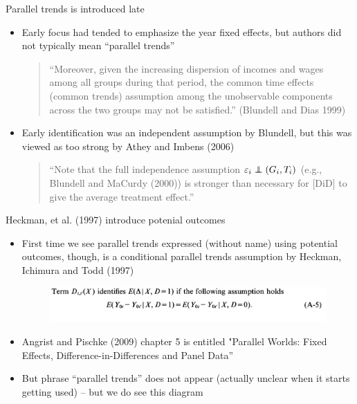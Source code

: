 \documentclass{beamer}
\newcommand\independent{\protect\mathpalette{\protect\independenT}{\perp}}
\def\independenT#1#2{\mathrel{\rlap{$#1#2$}\mkern2mu{#1#2}}}
\begin{document}
\begin{frame}{Parallel trends is introduced late}

\begin{itemize}

\item Early focus had tended to emphasize the year fixed effects, but authors did not typically mean ``parallel trends'' 
	\begin{quote}
	“Moreover, given the increasing dispersion of incomes and wages among all groups during that period, the common time effects (common trends) assumption among the unobservable components across the two groups may not be satisfied.” (Blundell and Dias 1999)
	\end{quote}
\item Early identification was an independent assumption by Blundell, but this was viewed as too strong by Athey and Imbens (2006)

\begin{quote}
“Note that the full independence assumption $\varepsilon_i \independent(G_i,T_i)$ (e.g., Blundell and MaCurdy (2000)) is stronger than necessary for [DiD] to give the average treatment effect.”
\end{quote}

\end{itemize}

\end{frame}


\begin{frame}{Heckman, et al. (1997) introduce potenial outcomes}


\begin{itemize}
\item First time we see parallel trends expressed (without name) using potential outcomes, though, is a conditional parallel trends assumption by Heckman, Ichimura and Todd (1997)

\bigskip

	\begin{figure}
	\includegraphics[scale=0.2]{./lecture_includes/heckman_cpt}
	\end{figure}


\item Angrist and Pischke (2009) chapter 5 is entitled "Parallel Worlds: Fixed Effects, Difference-in-Differences and Panel Data''
\item But phrase ``parallel trends'' does not appear (actually unclear when it starts getting used) -- but we do see this diagram
\end{itemize}


\end{frame}
\end{document}
